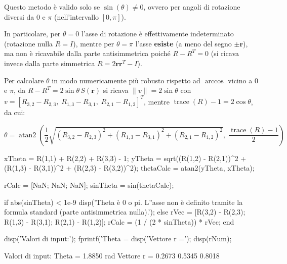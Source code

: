 \documentclass[11pt, a4paper]{article}
\begin{document}
\begin{par}
\begin{flushleft}
Questo metodo è valido solo se $\sin (\theta )\not= 0$, ovvero per angoli di rotazione diversi da $0$ e $\pi$ (nell'intervallo $[0,\pi]$).
\end{flushleft}
\end{par}

\begin{par}
\begin{flushleft}
In particolare, per $\theta = 0$ l'asse di rotazione è effettivamente indeterminato (rotazione nulla $R = I$), mentre per $\theta = \pi$ l'asse \textbf{esiste} (a meno del segno $\pm \mathbf{r}$), ma non è ricavabile dalla parte antisimmetrica poiché $R - R^T = 0$ (si ricava invece dalla parte simmetrica $R = 2\mathbf{r}\mathbf{r}^T - I$).
\end{flushleft}
\end{par}

\begin{par}
\begin{flushleft}
Per calcolare $\theta$ in modo numericamente più robusto rispetto ad $\arccos$ vicino a $0$ e $\pi$, da $R - R^T = 2\sin\theta\,S(\mathbf{r})$ si ricava $\|v\| = 2\sin\theta$ con $v = [R_{3,2}-R_{2,3},\; R_{1,3}-R_{3,1},\; R_{2,1}-R_{1,2}]^T$, mentre $\operatorname{trace}(R)-1 = 2\cos\theta$, da cui:
\end{flushleft}
\end{par}

\begin{par}
$$\theta = \operatorname{atan2}\left(\frac{1}{2}\sqrt{(R_{3,2}-R_{2,3})^2+(R_{1,3}-R_{3,1})^2+(R_{2,1}-R_{1,2})^2},\; \frac{\operatorname{trace}(R)-1}{2}\right)$$
\end{par}

\begin{matlabcode}
xTheta = R(1,1) + R(2,2) + R(3,3) - 1;
yTheta = sqrt((R(1,2) - R(2,1))^2 + (R(1,3) - R(3,1))^2 + (R(2,3) - R(3,2))^2);
thetaCalc = atan2(yTheta, xTheta);

rCalc = [NaN; NaN; NaN];
sinTheta = sin(thetaCalc);

if abs(sinTheta) < 1e-9
    disp('Theta è 0 o pi. L''asse non è definito tramite la formula standard (parte antisimmetrica nulla).');
else
    rVec = [R(3,2) - R(2,3); R(1,3) - R(3,1); R(2,1) - R(1,2)];
    rCalc = (1 / (2 * sinTheta)) * rVec;
end

disp('Valori di input:');
fprintf('Theta = %
disp('Vettore r =');
disp(rNum);
\end{matlabcode}
\begin{matlaboutput}
Valori di input:
Theta = 1.8850 rad
Vettore r =
    0.2673
    0.5345
    0.8018
\end{matlaboutput}
\end{document}
